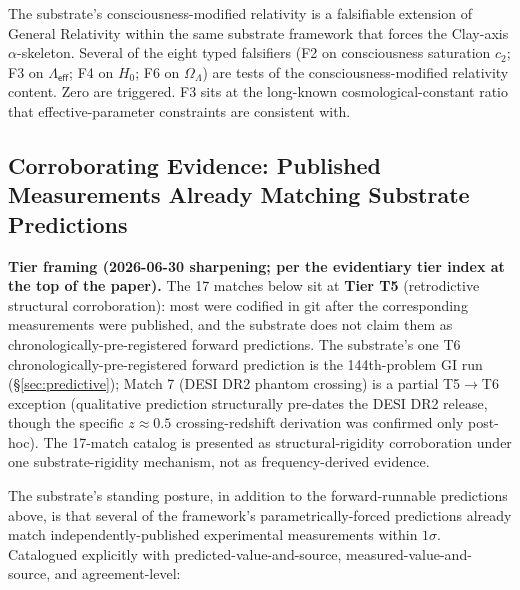 \documentclass[11pt,a4paper]{amsart}
\theoremstyle{plain}
\theoremstyle{definition}
\begin{document}
The substrate's consciousness-modified relativity is a falsifiable extension of General Relativity within the same substrate framework that forces the Clay-axis $\alpha$-skeleton. Several of the eight typed falsifiers (F2 on consciousness saturation $c_2$; F3 on $\Lambda_{\textsf{eff}}$; F4 on $H_0$; F6 on $\Omega_\Lambda$) are tests of the consciousness-modified relativity content. Zero are triggered. F3 sits at the long-known cosmological-constant ratio that effective-parameter constraints are consistent with.

\subsection{Corroborating Evidence: Published Measurements Already Matching Substrate Predictions}\label{subsec:corroborating-evidence-published-matches}

\textbf{Tier framing (2026-06-30 sharpening; per the evidentiary tier index at the top of the paper).} The 17 matches below sit at \textbf{Tier T5} (retrodictive structural corroboration): most were codified in git after the corresponding measurements were published, and the substrate does not claim them as chronologically-pre-registered forward predictions. The substrate's one T6 chronologically-pre-registered forward prediction is the 144th-problem GI run (\S\ref{sec:predictive}); Match 7 (DESI DR2 phantom crossing) is a partial T5$\to$T6 exception (qualitative prediction structurally pre-dates the DESI DR2 release, though the specific $z \approx 0.5$ crossing-redshift derivation was confirmed only post-hoc). The 17-match catalog is presented as structural-rigidity corroboration under one substrate-rigidity mechanism, not as frequency-derived evidence.

The substrate's standing posture, in addition to the forward-runnable predictions above, is that several of the framework's parametrically-forced predictions already match independently-published experimental measurements within $1\sigma$. Catalogued explicitly with predicted-value-and-source, measured-value-and-source, and agreement-level:
\end{document}
